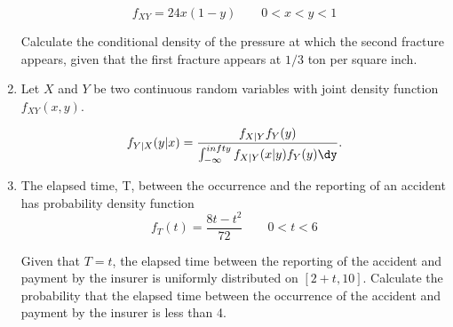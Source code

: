 \begin{exercises}
\begin{enumerate}
$$f_{XY}=24x(1-y) \qquad 0<x<y<1$$

Calculate the conditional density of the pressure at which the second fracture
appears, given that the first fracture appears at $1/3$ ton per square inch.


\item %
Let $X$ and $Y$ be two continuous random variables with joint density function
$f_{XY}(x,y)$.

$$f_{Y|X}(y|x) = \dfrac{f_{X|Y}f_Y(y)}{\int_{-\infty}^{infty}f_{X|Y}(x|y)f_Y(y)\dy}.$$

\item %
The elapsed time, T, between the occurrence and the reporting of an accident
has probability density function
$$f_T(t) = \dfrac{8t-t^2}{72} \qquad 0<t<6$$

Given that $T = t$, the elapsed time between the reporting of the accident
and payment by the insurer is uniformly distributed on $[2 + t, 10]$.
Calculate the probability that the elapsed time between the occurrence of
the accident and payment by the insurer is less than 4.
\end{enumerate}
\end{exercises}
